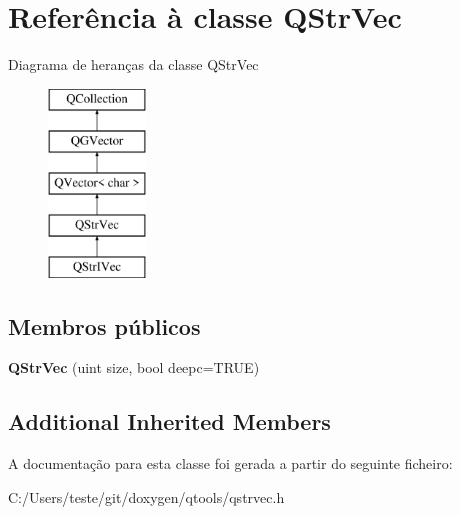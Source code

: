 \hypertarget{class_q_str_vec}{\section{Referência à classe Q\-Str\-Vec}
\label{class_q_str_vec}
}
Diagrama de heranças da classe Q\-Str\-Vec\begin{figure}[H]
\begin{center}
\leavevmode
\includegraphics[height=5.000000cm]{class_q_str_vec}
\end{center}
\end{figure}
\subsection*{Membros públicos}
\begin{DoxyCompactItemize}
\item 
\hypertarget{class_q_str_vec_a0adbb36dec438c91e830bc4c3b1582d8}{{\bfseries Q\-Str\-Vec} (uint size, bool deepc=T\-R\-U\-E)}\label{class_q_str_vec_a0adbb36dec438c91e830bc4c3b1582d8}

\end{DoxyCompactItemize}
\subsection*{Additional Inherited Members}


A documentação para esta classe foi gerada a partir do seguinte ficheiro\-:\begin{DoxyCompactItemize}
\item 
C\-:/\-Users/teste/git/doxygen/qtools/qstrvec.\-h\end{DoxyCompactItemize}
